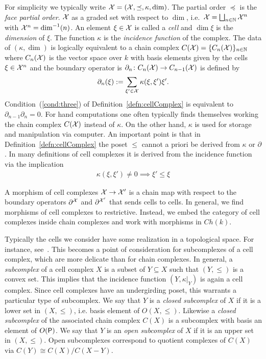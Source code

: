 For simplicity we typically write ${\mathcal X}=({\mathcal X},\preceq,\kappa,\dim)$.  
The partial order $\preceq$ is the {\em face partial order}.
${\mathcal X}$ as a graded set with respect to $\dim$, i.e.\ ${\mathcal X} = \bigsqcup_{n\in {\mathbb{N}}} {\mathcal X}^n$ with ${\mathcal X}^n = \dim^{-1}(n)$.  
An element $\xi\in {\mathcal X}$ is called a {\em cell} and $\dim \xi$ is the {\em dimension} of $\xi$. 
The function $\kappa$ is the {\em incidence function} of the complex.    The data of $(\kappa,\dim)$ is logically equivalent to a chain complex $C({\mathcal X}) = \{C_n({\mathcal X})\}_{n\in{\mathbb{N}}}$ where $C_n({\mathcal X})$ is the vector space over $k$ with basis elements given by the cells $\xi\in {\mathcal X}^n$ and the boundary operator is $\partial_n\colon C_n({\mathcal X}) \to C_{n-1}({\mathcal X})$ is defined by
\[
\partial_n( \xi) := \sum_{\xi' \in {\mathcal X}} \kappa(\xi, \xi')\xi'.
\]
Condition~(\ref{cond:three}) of Definition~\ref{defn:cellComplex} is equivalent to $\partial_{n-1}\partial_n = 0$.  For hand computations one often typically finds themselves working the chain complex $C({\mathcal X})$ instead of $\kappa$.  On the other hand, $\kappa$ is used for storage and manipulation via computer.  An important point is that in Definition~\ref{defn:cellComplex} the poset $\leq$ cannot a priori be derived from $\kappa$ or $\partial$.    In many definitions of cell complexes it is derived from the incidence function via the implication
\begin{align}\label{eqn:poset}
\kappa (\xi,\xi')\neq 0 \implies \xi'\leq \xi
\end{align}

A morphism of cell complexes ${\mathcal X}\to {\mathcal X}'$ is a chain map with respect to the boundary operators $\partial^{\mathcal X}$ and $\partial^{{\mathcal X}'}$ that sends cells to cells.  In general, we find morphisms of cell complexes to restrictive.  Instead, we embed the category of cell complexes inside chain complexes and work with morphisms in $Ch(k)$.


Typically the cells we consider have some realization in a topological space.  For instance, see~\cite{braids}.   This becomes a point of consideration for subcomplexes of a cell complex, which are more delicate than for chain complexes.  In general, a {\em subcomplex} of a cell complex $X$ is a subset of $Y\subseteq X$ such that $(Y,\leq)$ is a convex set.  This implies that the incidence function $(Y,\kappa|_Y)$ is again a cell complex. Since cell complexes have an undergirding poset, this warrants a particular type of subcomplex.  We say that $Y$ is a {\em closed subcomplex} of $X$ if it is a lower set in $(X,\leq)$, i.e. basis element of $O(X,\leq)$.   Likewise a {\em closed subcomplex} of the associated chain complex $C(X)$ is a subcomplex with basis an element of $O({\mathsf P})$.  We say that $Y$ is an {\em open subcomplex} of $X$ if it is an upper set in $(X,\leq)$.  Open subcomplexes correspond to quotient complexes of $C(X)$ via $C(Y)\cong C(X)/C(X-Y)$.

